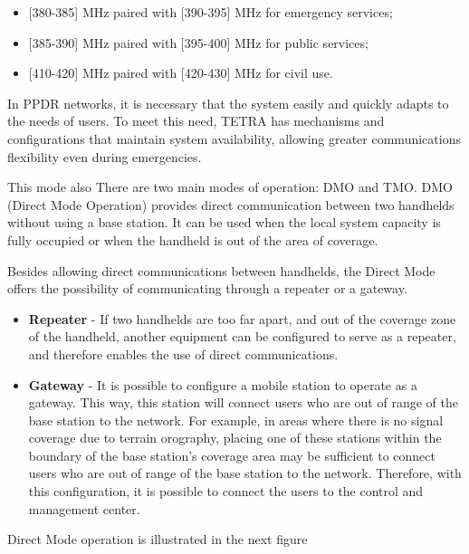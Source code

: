 \documentclass[letterpaper, 10 pt, conference]{ieeeconf}  %
\begin{document}
\begin{itemize}
    \item  \hspace{1.2mm}   [380-385] MHz paired with [390-395] MHz for emergency services;
    \item   \hspace{1.2mm}  [385-390] MHz paired with [395-400] MHz for public services;
    \item   \hspace{1.2mm}  [410-420] MHz paired with [420-430] MHz for civil use.
\end{itemize}
\par\noindent
In PPDR  networks, it is necessary that the system easily and quickly adapts to the needs of users. To meet this need, TETRA has mechanisms and configurations that maintain system availability, allowing greater communications flexibility even during emergencies.
\par\noindent This mode also There are two main modes of operation: DMO and TMO. DMO (Direct Mode Operation) provides direct communication between two handhelds without using a base station. It can be used when the local system capacity is fully occupied or when the handheld is out of the area of coverage.\par\noindent
Besides allowing direct communications between handhelds, the Direct Mode offers the possibility of communicating through a repeater or a gateway.
\begin{itemize}
    \item \textbf{Repeater} - If two handhelds are too far apart, and out of the coverage zone of the handheld, another equipment can be configured to serve as a repeater, and therefore enables the use of direct communications.
    \item \textbf{Gateway} - It is possible to configure a mobile station to operate as a gateway. This way, this station will connect users who are out of range of the base station to the network. For example, in areas where there is no signal coverage due to terrain orography, placing one of these stations within the boundary of the base station's coverage area may be sufficient to connect users who are out of range of the base station to the network. Therefore, with this configuration, it is possible to connect the users to the control and management center.
\end{itemize}
\par\noindent Direct Mode operation is illustrated in the next figure
\end{document}
